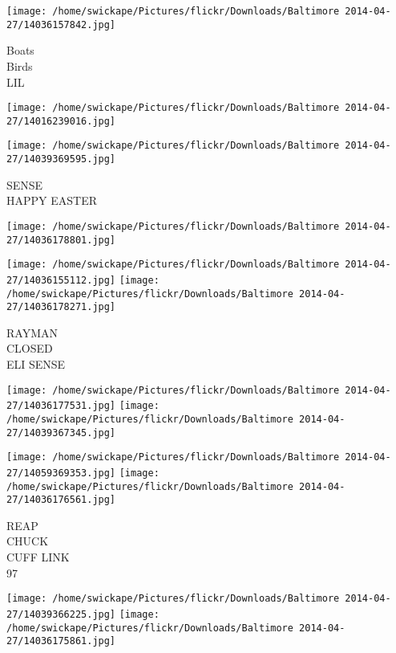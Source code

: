 \documentclass[10pt,letterpaper]{article}
\begin{document}
\vspace{0.25in}
\texttt{[image: /home/swickape/Pictures/flickr/Downloads/Baltimore 2014-04-27/14036157842.jpg]}

Boats\\
Birds\\
LIL\\
\pagebreak

\texttt{[image: /home/swickape/Pictures/flickr/Downloads/Baltimore 2014-04-27/14016239016.jpg]}

\vspace{0.25in}
\texttt{[image: /home/swickape/Pictures/flickr/Downloads/Baltimore 2014-04-27/14039369595.jpg]}

SENSE\\
HAPPY EASTER\\
\pagebreak

\texttt{[image: /home/swickape/Pictures/flickr/Downloads/Baltimore 2014-04-27/14036178801.jpg]}

\vspace{0.25in}
\texttt{[image: /home/swickape/Pictures/flickr/Downloads/Baltimore 2014-04-27/14036155112.jpg]}
\texttt{[image: /home/swickape/Pictures/flickr/Downloads/Baltimore 2014-04-27/14036178271.jpg]}

RAYMAN\\
CLOSED\\
ELI SENSE\\
\pagebreak

\texttt{[image: /home/swickape/Pictures/flickr/Downloads/Baltimore 2014-04-27/14036177531.jpg]}
\texttt{[image: /home/swickape/Pictures/flickr/Downloads/Baltimore 2014-04-27/14039367345.jpg]}

\texttt{[image: /home/swickape/Pictures/flickr/Downloads/Baltimore 2014-04-27/14059369353.jpg]}
\texttt{[image: /home/swickape/Pictures/flickr/Downloads/Baltimore 2014-04-27/14036176561.jpg]}

REAP\\
CHUCK\\
CUFF LINK\\
97\\
\pagebreak

\texttt{[image: /home/swickape/Pictures/flickr/Downloads/Baltimore 2014-04-27/14039366225.jpg]}
\texttt{[image: /home/swickape/Pictures/flickr/Downloads/Baltimore 2014-04-27/14036175861.jpg]}
\end{document}
